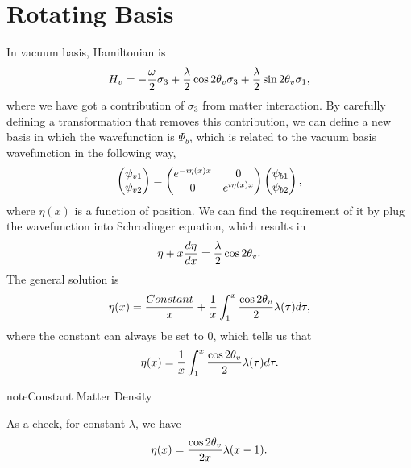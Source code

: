 \documentclass[letterpaper,12pt,english]{sphinxmanual}
\begin{document}
\section{Rotating Basis}
\label{basis:rotating-basis}
In vacuum basis, Hamiltonian is
\begin{gather}
\begin{split}H_v = -\frac{\omega}{2} \sigma_3 + \frac{\lambda}{2}\cos 2\theta_v \sigma_3 + \frac{\lambda}{2} \sin 2\theta_v \sigma_1,\end{split}\notag
\end{gather}
where we have got a contribution of \(\sigma_3\) from matter interaction. By carefully defining a transformation that removes this contribution, we can define a new basis in which the wavefunction is \(\Psi_b\), which is related to the vacuum basis wavefunction in the following way,
\begin{gather}
\begin{split}\begin{pmatrix}\psi_{v1} \\ \psi_{v2} \end{pmatrix}  = \begin{pmatrix}
e^{-i \eta(x) x} & 0 \\  0 & e^{i \eta(x) x}
\end{pmatrix} \begin{pmatrix}\psi_{b1} \\ \psi_{b2} \end{pmatrix},\end{split}\notag
\end{gather}
where \(\eta(x)\) is a function of position. We can find the requirement of it by plug the wavefunction into Schrodinger equation, which results in
\begin{gather}
\begin{split}\eta + x \frac{d\eta }{dx} = \frac{\lambda}{2} \cos 2\theta_v.\end{split}\notag
\end{gather}
The general solution is
\begin{gather}
\begin{split}\eta(x) = \frac{Constant}{x} + \frac{1}{x} \int_1^x \frac{\cos 2\theta_v}{2} \lambda(\tau) d\tau,\end{split}\notag
\end{gather}
where the constant can always be set to 0, which tells us that
\begin{gather}
\begin{split}\eta(x) = \frac{1}{x} \int_1^x \frac{\cos 2\theta_v}{2} \lambda(\tau) d\tau .\end{split}\notag
\end{gather}
\begin{notice}{note}{Constant Matter Density}

As a check, for constant \(\lambda\), we have
\begin{gather}
\begin{split}\eta(x) = \frac{\cos 2\theta_v }{2x} \lambda ( x-1 ).\end{split}\notag
\end{gather}\end{notice}
\end{document}
